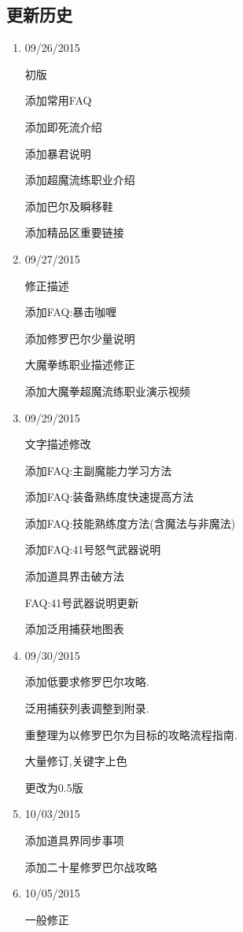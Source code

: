 	\subsection{更新历史}
	\begin{enumerate}
		\item 
		09/26/2015

		初版

		添加常用FAQ

		添加即死流介绍

		添加暴君说明

		添加超魔流练职业介绍

		添加巴尔及瞬移鞋

		添加精品区重要链接

		\item
		09/27/2015

		修正描述

		添加FAQ:暴击咖喱

		添加修罗巴尔少量说明

		大魔拳练职业描述修正

		添加大魔拳超魔流练职业演示视频


		\item
		09/29/2015

		文字描述修改

		添加FAQ:主副魔能力学习方法

		添加FAQ:装备熟练度快速提高方法

		添加FAQ:技能熟练度方法(含魔法与非魔法)

		添加FAQ:41号怒气武器说明

		添加道具界击破方法

		FAQ:41号武器说明更新

		添加泛用捕获地图表

		\item
		09/30/2015

		添加低要求修罗巴尔攻略.

		泛用捕获列表调整到附录.

		重整理为以修罗巴尔为目标的攻略流程指南.

		大量修订,关键字上色

		更改为0.5版

		\item
		10/03/2015

		添加道具界同步事项

		添加二十星修罗巴尔战攻略

		\item
		10/05/2015

		一般修正


\end{enumerate}
